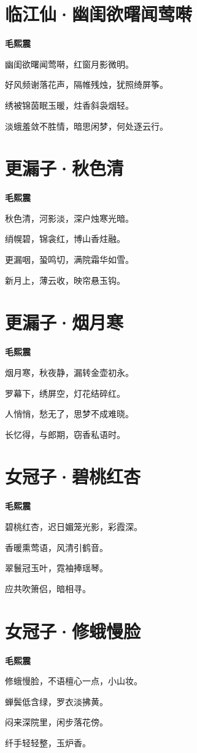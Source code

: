 \documentclass[12pt,a4paper]{ctexbook}
\begin{document}
\section{临江仙·幽闺欲曙闻莺啭}
\textbf{毛熙震}\par\vspace{0.5em}
幽闺欲曙闻莺啭，红窗月影微明。\par
好风频谢落花声，隔帷残烛，犹照绮屏筝。\par
绣被锦茵眠玉暖，炷香斜袅烟轻。\par
淡蛾羞敛不胜情，暗思闲梦，何处逐云行。\par

\section{更漏子·秋色清}
\textbf{毛熙震}\par\vspace{0.5em}
秋色清，河影淡，深户烛寒光暗。\par
绡幌碧，锦衾红，博山香炷融。\par
更漏咽，蛩鸣切，满院霜华如雪。\par
新月上，薄云收，映帘悬玉钩。\par

\section{更漏子·烟月寒}
\textbf{毛熙震}\par\vspace{0.5em}
烟月寒，秋夜静，漏转金壶初永。\par
罗幕下，绣屏空，灯花结碎红。\par
人悄悄，愁无了，思梦不成难晓。\par
长忆得，与郎期，窃香私语时。\par

\section{女冠子·碧桃红杏}
\textbf{毛熙震}\par\vspace{0.5em}
碧桃红杏，迟日媚笼光影，彩霞深。\par
香暖熏莺语，风清引鹤音。\par
翠鬟冠玉叶，霓袖捧瑶琴。\par
应共吹箫侣，暗相寻。\par

\section{女冠子·修蛾慢脸}
\textbf{毛熙震}\par\vspace{0.5em}
修蛾慢脸，不语檀心一点，小山妆。\par
蝉鬓低含绿，罗衣淡拂黄。\par
闷来深院里，闲步落花傍。\par
纤手轻轻整，玉炉香。\par
\end{document}
